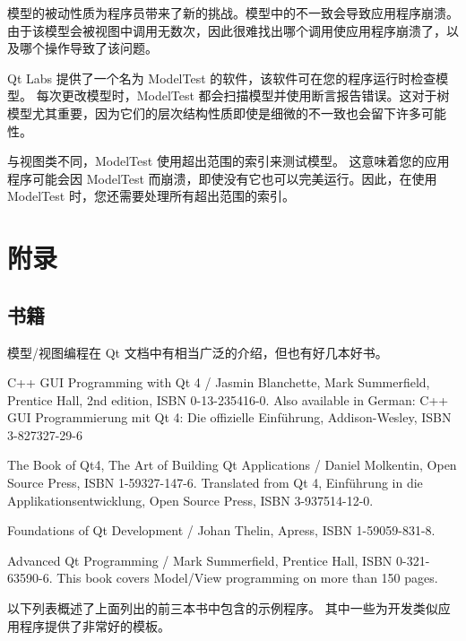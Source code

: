 模型的被动性质为程序员带来了新的挑战。模型中的不一致会导致应用程序崩溃。
由于该模型会被视图中调用无数次，因此很难找出哪个调用使应用程序崩溃了，以及哪个操作导致了该问题。

Qt Labs 提供了一个名为 ModelTest 的软件，该软件可在您的程序运行时检查模型。
每次更改模型时，ModelTest 都会扫描模型并使用断言报告错误。这对于树模型尤其重要，因为它们的层次结构性质即使是细微的不一致也会留下许多可能性。

与视图类不同，ModelTest 使用超出范围的索引来测试模型。
这意味着您的应用程序可能会因 ModelTest 而崩溃，即使没有它也可以完美运行。因此，在使用 ModelTest 时，您还需要处理所有超出范围的索引。

\section{附录}
\subsection{书籍}

模型/视图编程在 Qt 文档中有相当广泛的介绍，但也有好几本好书。

\begin{compactitem}[\arr]
\item C++ GUI Programming with Qt 4 / Jasmin Blanchette, Mark Summerfield, Prentice Hall, 2nd edition, ISBN 0-13-235416-0. 
      Also available in German: C++ GUI Programmierung mit Qt 4: Die offizielle Einführung, Addison-Wesley, ISBN 3-827327-29-6
\item The Book of Qt4, The Art of Building Qt Applications / Daniel Molkentin, Open Source Press, ISBN 1-59327-147-6. 
      Translated from Qt 4, Einführung in die Applikationsentwicklung, Open Source Press, ISBN 3-937514-12-0.
\item Foundations of Qt Development / Johan Thelin, Apress, ISBN 1-59059-831-8.
\item Advanced Qt Programming / Mark Summerfield, Prentice Hall, ISBN 0-321-63590-6. 
      This book covers Model/View programming on more than 150 pages.
\end{compactitem}

以下列表概述了上面列出的前三本书中包含的示例程序。
其中一些为开发类似应用程序提供了非常好的模板。

